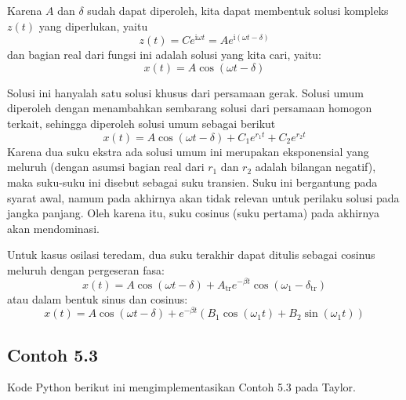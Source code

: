 Karena $A$ dan $\delta$ sudah dapat diperoleh, kita dapat membentuk solusi kompleks
$z(t)$ yang diperlukan, yaitu
\begin{equation}
z(t) = Ce^{\mathrm{i}\omega t} = A e^{\mathrm{i}(\omega t-\delta)}
\end{equation}
dan bagian real dari fungsi ini adalah solusi yang kita cari, yaitu:
\begin{equation}
x(t) = A\cos(\omega t - \delta)
\end{equation}

Solusi ini hanyalah satu solusi khusus dari persamaan gerak. Solusi
umum diperoleh dengan menambahkan sembarang solusi dari persamaan
homogon terkait, sehingga diperoleh solusi umum sebagai berikut
\begin{equation}
x(t) = A\cos(\omega t-\delta) + C_{1}e^{r_{1}t} + C_{2}e^{r_{2}t}
\end{equation}
Karena dua suku ekstra ada solusi umum ini merupakan eksponensial
yang meluruh (dengan asumsi bagian real dari $r_{1}$ dan $r_{2}$
adalah bilangan negatif), maka suku-suku ini disebut sebagai suku
transien. Suku ini bergantung pada syarat awal, namum pada akhirnya
akan tidak relevan untuk perilaku solusi pada jangka panjang. Oleh
karena itu, suku cosinus (suku pertama) pada akhirnya akan mendominasi.

Untuk kasus osilasi teredam, dua suku terakhir dapat ditulis sebagai
cosinus meluruh dengan pergeseran fasa:
\begin{equation}
x(t) = A\cos(\omega t-\delta)+A_{\mathrm{tr}}e^{-\beta t}\cos(\omega_{1}-\delta_{\mathrm{tr}})
\end{equation}
atau dalam bentuk sinus dan cosinus:
\begin{equation}
x(t) = A \cos(\omega t-\delta) + e^{-\beta t} \left(
    B_1 \cos(\omega_{1}t) + B_2 \sin(\omega_{1}t)
\right)
\end{equation}

\subsection{Contoh 5.3}

Kode Python berikut ini mengimplementasikan Contoh 5.3 pada Taylor.

